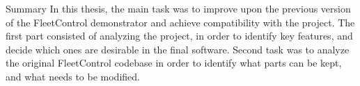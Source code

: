 \chap Summary
In this thesis, the main task was to improve upon the previous version of the FleetControl demonstrator and achieve compatibility with the {\mapfIR} project. \br
The first part consisted of analyzing the {\mapfIR} project, in order to identify key features, and decide which ones are desirable in the final software.
\br
Second task was to analyze the original FleetControl codebase in order to identify what parts can be kept, and what needs to be modified.
\br
 